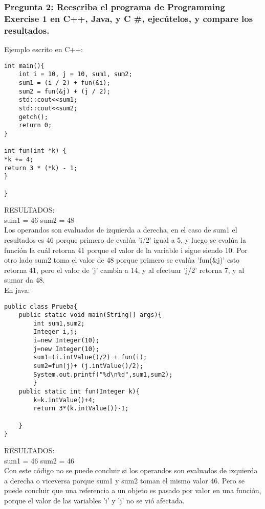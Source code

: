 \subsubsection{Pregunta 2: Reescriba el programa de Programming Exercise 1 en  C++, Java, y C \#, ejecútelos, y  compare los resultados.}


Ejemplo escrito en C++:\\

\lstset{language = C++} 
\begin{lstlisting}[frame = single] %Comienzo del Código
int main(){
	int i = 10, j = 10, sum1, sum2;
	sum1 = (i / 2) + fun(&i);
	sum2 = fun(&j) + (j / 2);
	std::cout<<sum1;
	std::cout<<sum2;
	getch();
	return 0;
}

int fun(int *k) {
*k += 4;
return 3 * (*k) - 1;
}

}
\end{lstlisting}
RESULTADOS: \\
sum1 = 46
sum2 = 48\\
Los operandos son evaluados de izquierda a derecha, en el caso de sum1 el resultados es 46 porque primero de evalúa 'i/2' igual a 5, y luego se evalúa la función la cuál  retorna 41 porque el valor de la variable i sigue siendo 10. Por otro lado sum2 toma el valor de 48 porque primero se evalúa 'fun(\&j)'  esto retorna 41, pero el valor de 'j' cambia a 14, y al efectuar 'j/2' retorna 7, y al sumar da 48.\\

En java:\\


\lstset{language = C++} 
\begin{lstlisting}[frame = single] %Comienzo del Código
public class Prueba{
	public static void main(String[] args){
		int sum1,sum2;
		Integer i,j;
		i=new Integer(10);
		j=new Integer(10);
		sum1=(i.intValue()/2) + fun(i);
		sum2=fun(j)+ (j.intValue()/2);
		System.out.printf("%d\n%d",sum1,sum2);
		}
	public static int fun(Integer k){
		k=k.intValue()+4;
		return 3*(k.intValue())-1;
		
	}
}
\end{lstlisting}

RESULTADOS: \\
sum1 = 46
sum2 = 46\\

Con este código no se puede concluir si los operandos son evaluados de izquierda a derecha o viceversa porque sum1 y sum2 toman el mismo valor 46. Pero se puede concluir que una referencia a un objeto es pasado por valor en una función, porque el valor de las variables 'i' y 'j' no se vió afectada.\\

